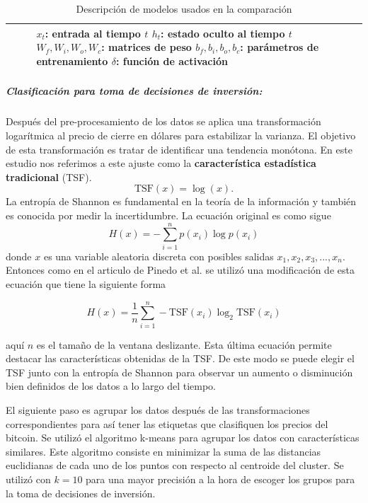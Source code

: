\begin{table}
\begin{adjustbox}{width=0.95\textwidth}
\begin{tabular} {m{2cm} m{9cm} m{7cm}}
\begin{align}
\begin{split}
			\end{split}
		\end{align}
		& 
		$x_{t}$: entrada al tiempo $t$ \newline
		$h_{t}$: estado oculto al tiempo $t$	\newline
		$W_{f},W_{i},W_{o},W_{c}$: matrices de peso\newline
		$b_{f},b_{i},b_{o},b_{c}$: parámetros de entrenamiento\newline
		$\delta$: función de activación
		\\
		\bottomrule
	\end{tabular}
	\end{adjustbox}
	\caption{Descripción de modelos usados en la comparación}
	\label{tab:Table8}
\end{table}


\subparagraph{Clasificación para toma de decisiones de inversión:} Después del pre-procesamiento de los datos se aplica una transformación logarítmica al precio de cierre en dólares para estabilizar la varianza. El objetivo de esta transformación es tratar de identificar una tendencia monótona. En este estudio nos referimos a este ajuste como la \textbf{característica estadística tradicional} (TSF)\cite{pinedo-sanchezVibrationAnalysisBearings2020}.\\

\[ 
	\textrm{TSF}(x) = \log(x).
\]
La entropía de Shannon es fundamental en la teoría de la información y también es conocida por medir la incertidumbre. La ecuación original es como sigue
\[ H(x) = -\sum_{i=1}^{n}p(x_i)\log{p(x_i)} \]
donde $x$ es una variable aleatoria discreta con posibles salidas $x_1,x_2,x_3,...,x_n$. Entonces como en el articulo de Pinedo et al. \cite{pinedo-sanchezVibrationAnalysisBearings2020} se utilizó una modificación de esta ecuación que tiene la siguiente forma

\[ H(x) = \frac{1}{n} \sum_{i=1}^{n}-\textrm{TSF}(x_i)\log_2{\textrm{TSF}(x_i)} \]

aquí $n$ es el tamaño de la ventana deslizante. Esta última ecuación permite destacar las características obtenidas de la TSF. De este modo se puede elegir el TSF junto con la entropía de Shannon para observar un aumento o disminución bien definidos de los datos a lo largo del tiempo.

El siguiente paso es agrupar los datos después de las transformaciones correspondientes para así tener las etiquetas que clasifiquen los precios del bitcoin. Se utilizó el algoritmo k-means para agrupar los datos con características similares. Este algoritmo consiste en minimizar la suma de las distancias euclidianas de cada uno de los puntos con respecto al centroide del cluster. Se utilizó con $k=10$ para una mayor precisión a la hora de escoger los grupos para la toma de decisiones de inversión.

